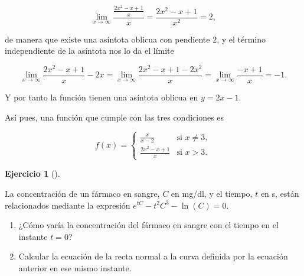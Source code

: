 \documentclass[
  spanish,
  a4paper,
]{scrreport}
\theoremstyle{definition}
\newtheorem{exercise}{Ejercicio}[chapter]
\theoremstyle{remark}
\begin{document}
\begin{tcolorbox}
\[
\lim_{x\to\infty} \frac{\frac{2x^2-x+1}{x}}{x} 
= \frac{2x^2-x+1}{x^2} = 2,
\]

de manera que existe una asíntota oblicua con pendiente \(2\), y el
término independiente de la asíntota nos lo da el límite

\[
\lim_{x\to\infty} \frac{2x^2-x+1}{x}-2x
= \lim_{x\to\infty} \frac{2x^2-x+1-2x^2}{x} 
= \lim_{x\to\infty} \frac{-x+1}{x}
=-1.
\]

Y por tanto la función tienen una asíntota oblicua en \(y=2x-1\).

Así pues, una función que cumple con las tres condiciones es

\[
f(x) =
\begin{cases}
\frac{x}{x-2} & \mbox{si } x\neq 3,\\
\frac{2x^2-x+1}{x} & \mbox{si } x>3.
\end{cases}
\]

\end{tcolorbox}

\begin{exercise}[]\protect\hypertarget{exr-5}{}\label{exr-5}

La concentración de un fármaco en sangre, \(C\) en mg/dl, y el tiempo,
\(t\) en s, están relacionados mediante la expresión
\(e^{tC}-t^2C^3-\ln(C)=0\).

\begin{enumerate}
\def\labelenumi{\alph{enumi}.}
\item
  ¿Cómo varía la concentración del fármaco en sangre con el tiempo en el
  instante \(t=0\)?
\item
  Calcular la ecuación de la recta normal a la curva definida por la
  ecuación anterior en ese mismo instante.
\end{enumerate}

\end{exercise}
\end{document}
